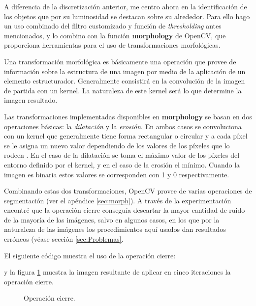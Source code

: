 \documentclass[a4paper,12pt]{article}
\begin{document}
A diferencia de la discretización anterior, me centro ahora en la identificación de los objetos que por su luminosidad se destacan sobre su alrededor. Para ello hago un uso combinado del filtro customizado y función de \textit{thresholding} antes mencionados, y lo combino con la función \textbf{morphology}\cite{morphologyex} de OpenCV, que proporciona herramientas para el uso de transformaciones morfológicas.

Una transformación morfológica es básicamente una operación que provee de información sobre la estructura de una imagen por medio de la aplicación de un elemento estructurador. Generalmente consistirá en la convolución de la imagen de partida con un kernel. La naturaleza de este kernel será lo que determine la imagen resultado.

Las transformaciones implementadas disponibles en \textbf{morphology} se basan en dos operaciones básicas: la \textit{dilatación} y la \textit{erosión}. En ambos casos se convoluciona con un kernel que generalmente tiene forma rectangular o circular y a cada píxel se le asigna un nuevo valor dependiendo de los valores de los píxeles que lo rodeen . En el caso de la dilatación se toma el máximo valor de los píxeles del entorno definido por el kernel, y en el caso de la erosión el mínimo. Cuando la imagen es binaria estos valores se corresponden con 1 y 0 respectivamente.

Combinando estas dos transformaciones, OpenCV provee de varias operaciones de segmentación (ver el apéndice \ref{sec:morph}).
A través de la experimentación encontré que la operación cierre conseguía descartar la mayor cantidad de ruido de la mayoría de las imágenes, salvo en algunos casos, en los que por la naturaleza de las imágenes los procedimientos aquí usados dan resultados erróneos (véase sección \ref{sec:Problemas}.

El siguiente código muestra el uso de la operación cierre:

y la figura \ref{fig:img4} muestra la imagen resultante de aplicar en cinco iteraciones la operación cierre.
\begin{figure}[h!]
\centering
{}
\caption{Operación cierre.}
\label{fig:img4}
\end{figure}
\end{document}
